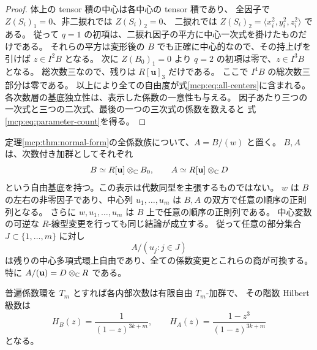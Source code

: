 \begin{proof}
体上の tensor 積の中心は各中心の tensor 積であり、
全因子で $Z(S_i)_1=0$、非二捩れでは $Z(S_i)_2=0$、
二捩れでは $Z(S_i)_2=\langle x_i^2,y_i^2,z_i^2\rangle$ である。
従って $q=1$ の初項は、二捩れ因子の平方に中心一次式を掛けたものだけである。
それらの平方は変形後の $B$ でも正確に中心的なので、その持上げを引けば
$z\in I^2B$ となる。
次に $Z(B_0)_1=0$ より $q=2$ の初項は零で、$z\in I^3B$ となる。
総次数三なので、残りは $R[\mathbf u]_3$ だけである。
ここで $I^4B$ の総次数三部分は零である。
以上により全ての自由度が式\eqref{mcp:eq:all-centers}に含まれる。
各次数層の基底独立性は、表示した係数の一意性も与える。
因子あたり三つの一次式と三つの二次式、最後の一つの三次式の係数を数えると
式\eqref{mcp:eq:parameter-count}を得る。
\end{proof}

\begin{proposition}[商の自由性と任意順序の中心正則列]
\label{mcp:prop:free-quotient}
定理\ref{mcp:thm:normal-form}の全係数族について、$A=B/(w)$ と置く。
$B,A$ は、次数付き加群としてそれぞれ
\begin{equation}\label{mcp:eq:free-bases}
       B\simeq R[\mathbf u]\otimes_{\mathbb C}B_0,\qquad
       A\simeq R[\mathbf u]\otimes_{\mathbb C}D
\end{equation}
という自由基底を持つ。この表示は代数同型を主張するものではない。
$w$ は $B$ の左右の非零因子であり、中心列 $u_1,\ldots,u_m$ は
$B,A$ の双方で任意の順序の正則列となる。
さらに $w,u_1,\ldots,u_m$ は $B$ 上で任意の順序の正則列である。
中心変数の可逆な $R$-線型変更を行っても同じ結論が成立する。
従って任意の部分集合 $J\subset\{1,\ldots,m\}$ に対し
\[
 A/(u_j:j\in J)
\]
は残りの中心多項式環上自由であり、全ての係数変更とこれらの商が可換する。
特に $A/(\mathbf u)=D\otimes_{\mathbb C}R$ である。

普遍係数環を $T_m$ とすれば各内部次数は有限自由 $T_m$-加群で、
その階数 Hilbert 級数は
\begin{equation}\label{mcp:eq:hilbert}
       H_B(z)=\frac1{(1-z)^{3k+m}},\qquad
       H_A(z)=\frac{1-z^3}{(1-z)^{3k+m}}
\end{equation}
となる。
\end{proposition}


